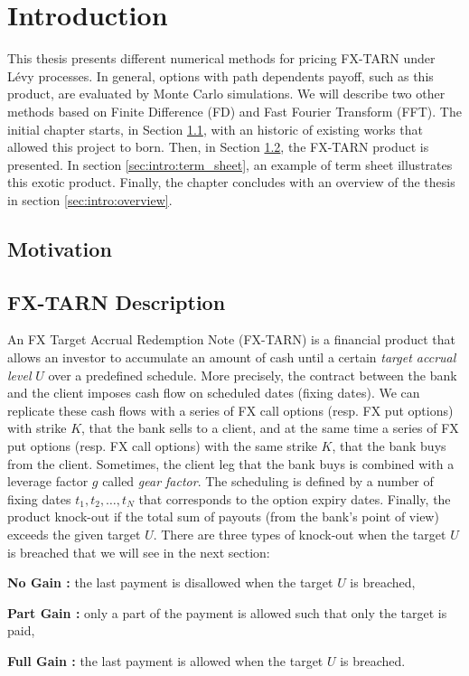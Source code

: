 \chapter{Introduction}
\label{sec:intro}


This thesis presents different numerical methods for pricing FX-TARN under L\'evy processes. In general, options with path dependents payoff, such as this product, are evaluated by Monte Carlo simulations. We will describe two other methods based on Finite Difference (FD) and Fast Fourier Transform (FFT). The initial chapter starts, in Section \ref{sec:intro:motivation}, with an historic of existing works that allowed this project to born. Then, in Section \ref{sec:intro:description}, the FX-TARN product is presented. In section \ref{sec:intro:term_sheet}, an example of term sheet illustrates this exotic product. Finally, the chapter concludes with an overview of the thesis in section \ref{sec:intro:overview}.

\section{Motivation}
\label{sec:intro:motivation}

\section{FX-TARN Description}
\label{sec:intro:description}
An FX Target Accrual Redemption Note (FX-TARN) is a financial product that allows an investor to accumulate an amount of cash until a certain \textit{target accrual level} $U$ over a predefined schedule. More precisely, the contract between the bank and the client imposes cash flow on scheduled dates (fixing dates). We can replicate these cash flows with a series of FX call options (resp. FX put options) with strike $K$, that the bank sells to a client, and at the same time a series of FX put options (resp. FX call options) with the same strike $K$, that the bank buys from the client. Sometimes, the client leg that the bank buys is combined with a leverage factor $g$ called \textit{gear factor}. The scheduling is defined by a number of fixing dates $t_1,t_2,\ldots,t_N$ that corresponds to the option expiry dates. Finally, the product knock-out if the total sum of payouts (from the bank's point of view) exceeds the given target $U$. There are three types of knock-out when the target $U$ is breached that we will see in the next section:
\begin{my_list_item}
\item \textbf{No Gain :} the last payment is disallowed when the target $U$ is breached,
\item \textbf{Part Gain :} only a part of the payment is allowed such that only the target is paid,
\item \textbf{Full Gain :} the last payment is allowed when the target $U$ is breached. 
\end{my_list_item}

